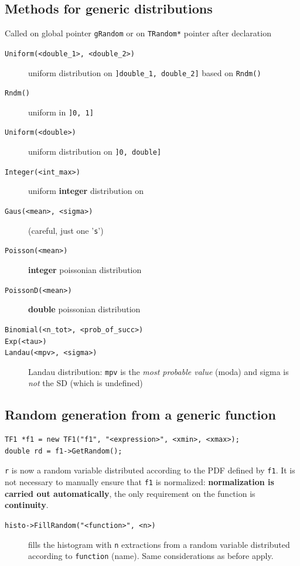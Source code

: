 \documentclass[10pt, twoside]{article}
\newcommand{\ttt}[1]{\colorbox{boxgray}{\texttt{#1}}}
\begin{document}
\subsection{Methods for generic distributions}
Called on global pointer \ttt{gRandom} or on \ttt{TRandom*} pointer after declaration
\begin{description}
\item[\ttt{Uniform(<double\_1>, <double\_2>)}] uniform distribution on \texttt{\big]double\_1, double\_2\big]} based on \ttt{Rndm()}
\item[\ttt{Rndm()}] uniform in \texttt{\big]0, 1\big]}
\item[\ttt{Uniform(<double>)}] uniform distribution on \texttt{\big]0, double\big]}
\item[\ttt{Integer(<int\_max>)}] uniform \textbf{integer} distribution on \texttt{}
\item[\ttt{Gaus(<mean>, <sigma>)}] (careful, just one '\ttt{s}')
\item[\ttt{Poisson(<mean>)}] \textbf{integer} poissonian distribution
\item[\ttt{PoissonD(<mean>)}] \textbf{double} poissonian distribution
\item[\ttt{Binomial(<n\_tot>, <prob\_of\_succ>)}]
\item[\ttt{Exp(<tau>)}]
\item[\ttt{Landau(<mpv>, <sigma>)}] Landau distribution: \ttt{mpv} is the \textit{most probable value} (moda) and sigma is \textit{not} the SD (which is undefined)
\end{description}

\subsection{Random generation from a generic function}
\begin{verbatim}
TF1 *f1 = new TF1("f1", "<expression>", <xmin>, <xmax>);
double rd = f1->GetRandom();
\end{verbatim}
\ttt{r} is now a random variable distributed according to the PDF defined by \ttt{f1}. It is not necessary to manually ensure that \ttt{f1} is normalized: \textbf{normalization is carried out automatically}, the only requirement on the function is \textbf{continuity}.
\begin{description}
\item[\ttt{histo->FillRandom("<function>", <n>)}] fills the histogram with \ttt{n} extractions from a random variable distributed according to \ttt{function} (name). Same considerations as before apply.
\end{description}
\end{document}
